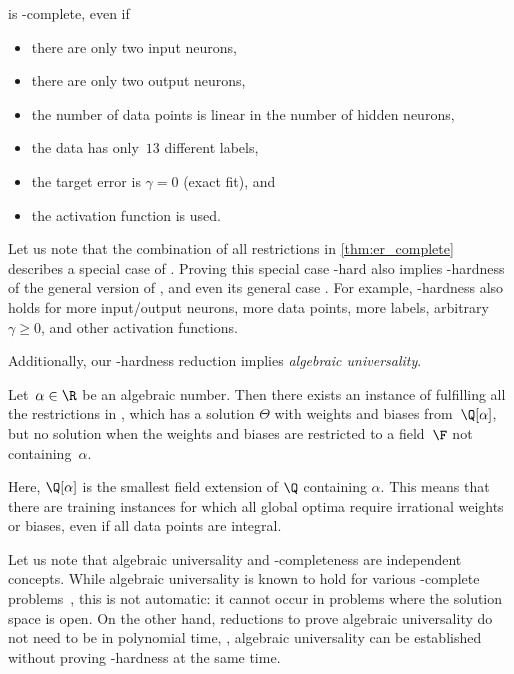 \begin{theorem}
    \label{thm:er_complete}
    \trainNN is \ER-complete, even if
    \begin{itemize}[nosep]
        \item there are only two input neurons,
        \item there are only two output neurons,
        \item the number of data points is linear in the number of hidden neurons,
        \item the data has only~$13$ different labels,
        \item the target error is $\gamma=0$ 
        (exact fit),
        and
        \item the \ReLU activation function is used.
    \end{itemize}
\end{theorem}

Let us note that the combination of all restrictions in \cref{thm:er_complete} describes a special case of \trainNN.
Proving this special case \ER-hard also implies \ER-hardness of the general version of \trainNN, and even its general case \ERM.
For example, \ER-hardness also holds for more input/output neurons, more data points, more labels, arbitrary~$\gamma \geq 0$, and other activation functions.

Additionally, our \ER-hardness reduction implies \emph{algebraic universality}.

\begin{theorem}
    \label{thm:universality}
    Let~$\alpha \in \R$ be an algebraic number.
    Then there exists an instance of \trainNN fulfilling all the restrictions in , which has a %
solution $\Theta$
with weights and biases %
%
from~$\Q[\alpha]$, but no solution when the weights and biases %
are restricted to a field~$\F$ not containing~$\alpha$.
\end{theorem}

Here, $\Q[\alpha]$ is the smallest field extension of $\Q$ containing $\alpha$. 
This means that there are training instances for which all global optima require irrational weights or biases, even if all data points are integral.

Let us note that algebraic universality and \ER-completeness are independent 
concepts. %
While algebraic universality is known to hold for various \ER-complete 
problems~\cite{Abrahamsen2019_Toolbox}, this is not %
automatic: it  %
cannot occur in problems where the solution space is open.
On the other hand, reductions to prove algebraic universality do not need to be in polynomial
time, \ie, algebraic universality can be established without proving \ER-hardness at the
same time.



